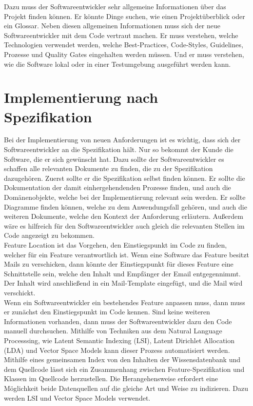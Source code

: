 Dazu muss der Softwareentwickler sehr allgemeine Informationen über das Projekt finden können.
Er könnte Dinge suchen, wie einen Projektüberblick oder ein Glossar.
Neben diesen allgemeinen Informationen muss sich der neue Softwareentwickler mit dem Code vertraut machen.
Er muss verstehen, welche Technologien verwendet werden, welche Best-Practices, Code-Styles, Guidelines, Prozesse und Quality Gates eingehalten werden müssen.
Und er muss verstehen, wie die Software lokal oder in einer Testumgebung ausgeführt werden kann.\\

\section{Implementierung nach Spezifikation}
Bei der Implementierung von neuen Anforderungen ist es wichtig, dass sich der Softwareentwickler an die Spezifikation hält.
Nur so bekommt der Kunde die Software, die er sich gewünscht hat.
Dazu sollte der Softwareentwickler es schaffen alle relevanten Dokumente zu finden, die zu der Spezifikation dazugehören.
Zuerst sollte er die Spezifikation selbst finden können.
Er sollte die Dokumentation der damit einhergehendenden Prozesse finden, und auch die Domänenobjekte, welche bei der Implementierung relevant sein werden.
Er sollte Diagramme finden können, welche zu dem Anwendungsfall gehören, und auch die weiteren Dokumente, welche den Kontext der Anforderung erläutern.
Außerdem wäre es hilfreich für den Softwareentwickler auch gleich die relevanten Stellen im Code angezeigt zu bekommen.\\

Feature Location ist das Vorgehen, den Einstiegspunkt im Code zu finden, welcher für ein Feature verantwortlich ist.
Wenn eine Software das Feature besitzt Mails zu verschicken, dann könnte der Einstiegspunkt für dieses Feature eine Schnittstelle sein, welche den Inhalt und Empfänger der Email entgegennimmt.
Der Inhalt wird anschließend in ein Mail-Template eingefügt, und die Mail wird verschickt.\\

Wenn ein Softwareentwickler ein bestehendes Feature anpassen muss, dann muss er zunächst den Einstiegspunkt im Code kennen.
Sind keine weiteren Informationen vorhanden, dann muss der Softwareentwickler dazu den Code manuell durchsuchen.
Mithilfe von Techniken aus dem Natural Language Processsing, wie Latent Semantic Indexing (LSI), Latent Dirichlet Allocation (LDA) und Vector Space Models kann dieser Prozess automatisiert werden.\cite{Dit_Revelle_Gethers_Poshyvanyk_2011}
Mithilfe eines gemeinsamen Index von den Inhalten der Wissensdatenbank und dem Quellcode lässt sich ein Zusammenhang zwischen Feature-Spezifikation und Klassen im Quellcode herzustellen.
Die Herangehensweise erfordert eine Möglichkeit beide Datenquellen auf die gleiche Art und Weise zu indizieren.
Dazu werden LSI und Vector Space Models verwendet.\cite{Antoniol_Canfora_Casazza_DeLucia_2000}

